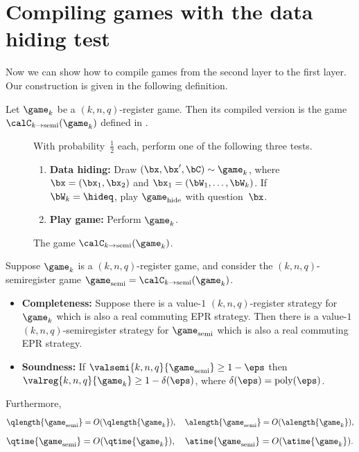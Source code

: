 \section{Compiling games with the data hiding test}\label{sec:compile-sec}

Now we can show how to compile games from the second layer to the first layer.
Our construction is given in the following definition.

\begin{definition}
Let $\game_k$ be a $(k, n, q)$-register game.
Then its compiled version is the game $\calC_{k \rightarrow \mathrm{semi}}(\game_k)$ defined in .
\end{definition}
{
\begin{figure}
With probability~$\tfrac{1}{2}$ each, perform one of the following three tests.
\begin{enumerate}
	\item \textbf{Data hiding:} Draw $(\bx, \bx', \bC) \sim \game_k$, where $\bx = (\bx_1, \bx_2)$ and $\bx_1 = (\bW_1, \ldots, \bW_k)$.
			 If $\bW_k = \hideq$, play $\game_{\mathrm{hide}}$ with question~$\bx$.\label{item:data-hiding}
	\item \textbf{Play game:} Perform $\game_{k}$.\label{item:play-ball!}
	\end{enumerate}
	\caption{The game $\calC_{k \rightarrow \mathrm{semi}}(\game_k)$.\label{fig:two-to-one}}
\end{figure}
}

\begin{theorem}\label{theorem:two-to-one-compiler}
Suppose $\game_k$ is a $(k, n, q)$-register game,
and consider the $(k, n, q)$-semiregister game $\game_{\mathrm{semi}} = \calC_{k \rightarrow \mathrm{semi}}(\game_k)$.
\begin{itemize}
\item[$\circ$] \textbf{Completeness:} 
	Suppose there is a value-$1$ $(k,n,q)$-register strategy for $\game_{k}$ which is also a real commuting EPR strategy.
	Then there is a value-$1$ $(k,n,q)$-semiregister strategy for $\game_{\mathrm{semi}}$ which is also a real commuting EPR strategy.
\item[$\circ$] \textbf{Soundness:} If $\valsemi{k,n,q}{\game_{\mathrm{semi}}} \geq 1-\eps$ then $\valreg{k,n,q}{\game_{k}} \geq 1 -\delta(\eps)$, where $\delta(\eps) = \mathrm{poly}(\eps)$.
\end{itemize}
Furthermore,
\begin{equation*}
\qlength{\game_{\mathrm{semi}}} = O(\qlength{\game_k}), \quad
\alength{\game_{\mathrm{semi}}} = O(\alength{\game_k}),
\end{equation*}
\begin{equation*}
\qtime{\game_{\mathrm{semi}}} = O(\qtime{\game_k}), \quad
\atime{\game_{\mathrm{semi}}} = O(\atime{\game_k}).
\end{equation*}
\end{theorem}

